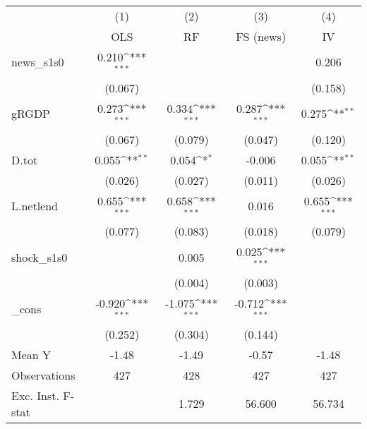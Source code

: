 {
\def\sym#1{\ifmmode^{#1}\else\(^{#1}\)\fi}
\begin{tabular}{l*{4}{c}}
\toprule
            &\multicolumn{1}{c}{(1)}&\multicolumn{1}{c}{(2)}&\multicolumn{1}{c}{(3)}&\multicolumn{1}{c}{(4)}\\
            &\multicolumn{1}{c}{OLS}&\multicolumn{1}{c}{RF}&\multicolumn{1}{c}{FS (news)}&\multicolumn{1}{c}{IV}\\
\midrule
news\_s1s0   &       0.210\sym{***}&                     &                     &       0.206         \\
            &     (0.067)         &                     &                     &     (0.158)         \\
\addlinespace
gRGDP       &       0.273\sym{***}&       0.334\sym{***}&       0.287\sym{***}&       0.275\sym{**} \\
            &     (0.067)         &     (0.079)         &     (0.047)         &     (0.120)         \\
\addlinespace
D.tot       &       0.055\sym{**} &       0.054\sym{*}  &      -0.006         &       0.055\sym{**} \\
            &     (0.026)         &     (0.027)         &     (0.011)         &     (0.026)         \\
\addlinespace
L.netlend   &       0.655\sym{***}&       0.658\sym{***}&       0.016         &       0.655\sym{***}\\
            &     (0.077)         &     (0.083)         &     (0.018)         &     (0.079)         \\
\addlinespace
shock\_s1s0  &                     &       0.005         &       0.025\sym{***}&                     \\
            &                     &     (0.004)         &     (0.003)         &                     \\
\addlinespace
\_cons      &      -0.920\sym{***}&      -1.075\sym{***}&      -0.712\sym{***}&                     \\
            &     (0.252)         &     (0.304)         &     (0.144)         &                     \\
\midrule
Mean Y      &       -1.48         &       -1.49         &       -0.57         &       -1.48         \\
Observations&         427         &         428         &         427         &         427         \\
Exc. Inst. F-stat&                     &       1.729         &      56.600         &      56.734         \\
\bottomrule
\end{tabular}
}
